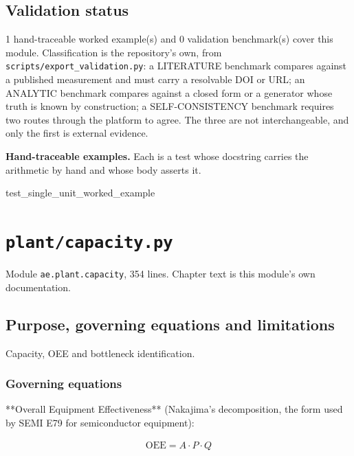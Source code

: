 \documentclass[10pt,a4paper,twoside]{report}
\begin{document}
\section{Validation status}

1 hand-traceable worked example(s) and 0 validation benchmark(s) cover this module. Classification is the repository's own, from \texttt{scripts/export\_validation.py}: a LITERATURE benchmark compares against a published measurement and must carry a resolvable DOI or URL; an ANALYTIC benchmark compares against a closed form or a generator whose truth is known by construction; a SELF-CONSISTENCY benchmark requires two routes through the platform to agree. The three are not interchangeable, and only the first is external evidence.

\textbf{Hand-traceable examples.} Each is a test whose docstring carries the arithmetic by hand and whose body asserts it.

\begin{verbatimsmall}
test_single_unit_worked_example
\end{verbatimsmall}

\clearpage

\chapter{\texttt{plant/capacity.py}}\label{ch:capacity}


{\footnotesize\color{slate}Module \texttt{ae.plant.capacity}, 354 lines. Chapter text is this module's own documentation.\par}

\section{Purpose, governing equations and limitations}

Capacity, OEE and bottleneck identification.

\subsection*{Governing equations}

**Overall Equipment Effectiveness** (Nakajima's decomposition, the form used by SEMI E79 for semiconductor equipment):

\begin{equation*}
\begin{gathered}
\mathrm{OEE} = A \cdot P \cdot Q
\end{gathered}
\end{equation*}
\end{document}
